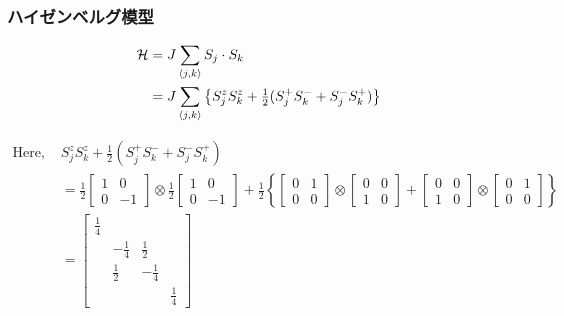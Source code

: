 
\begin{frame}[c,fragile]
  \frametitle{ハイゼンベルグ模型}
\setlength{\fboxsep}{1pt}

\noindent
\begin{align*}
\mathcal{H} &= J \sum\limits_{\langle j,k \rangle} {\boldmath S}_j \cdot S_k \\
&= J \sum\limits_{\langle j,k \rangle} \left\{ S^z_j S^z_k + \tfrac{1}{2}(S^+_j S^-_k + S^-_j S^+_k) \right\}
\end{align*}

\begin{align*}
\text{Here, } & S^z_j S^z_k + \tfrac{1}{2}(S^+_j S^-_k + S^-_j S^+_k) \\
 &=
\tfrac{1}{2}
\begin{bmatrix}
1 & 0 \\
0 & -1
\end{bmatrix}
\otimes
\tfrac{1}{2}
\begin{bmatrix}
1 & 0 \\
0 & -1
\end{bmatrix}
+
\tfrac{1}{2}\left\{
\begin{bmatrix}
0 & 1 \\
0 & 0
\end{bmatrix}
\otimes
\begin{bmatrix}
0 & 0 \\
1 & 0
\end{bmatrix}
+
\begin{bmatrix}
0 & 0 \\
1 & 0
\end{bmatrix}
\otimes
\begin{bmatrix}
0 & 1 \\
0 & 0
\end{bmatrix}
\right\}\\
&=
\begin{bmatrix}
\tfrac{1}{4} & & & \\
 & - \tfrac{1}{4} & \tfrac{1}{2} & \\
 & \tfrac{1}{2} & - \tfrac{1}{4} & \\
 & & & \tfrac{1}{4}
\end{bmatrix}
\end{align*}

\end{frame}

